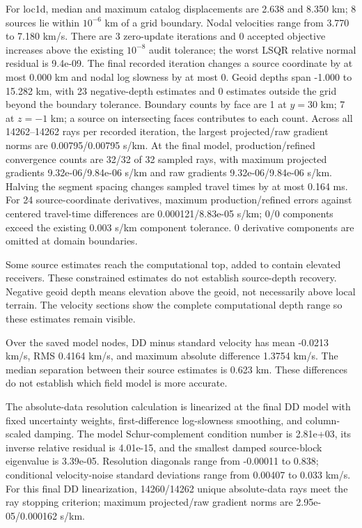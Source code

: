 For loc1d, median and maximum catalog displacements are 2.638 and 8.350 km; 8 sources lie within $10^{-6}$ km of a grid boundary. Nodal velocities range from 3.770 to 7.180 km/s. There are 3 zero-update iterations and 0 accepted objective increases above the existing $10^{-8}$ audit tolerance; the worst LSQR relative normal residual is 9.4e-09. The final recorded iteration changes a source coordinate by at most 0.000 km and nodal log slowness by at most 0. Geoid depths span -1.000 to 15.282 km, with 23 negative-depth estimates and 0 estimates outside the grid beyond the boundary tolerance. Boundary counts by face are 1 at $y=30$ km; 7 at $z=-1$ km; a source on intersecting faces contributes to each count. Across all 14262--14262 rays per recorded iteration, the largest projected/raw gradient norms are 0.00795/0.00795 s/km. At the final model, production/refined convergence counts are 32/32 of 32 sampled rays, with maximum projected gradients 9.32e-06/9.84e-06 s/km and raw gradients 9.32e-06/9.84e-06 s/km. Halving the segment spacing changes sampled travel times by at most 0.164 ms. For 24 source-coordinate derivatives, maximum production/refined errors against centered travel-time differences are 0.000121/8.83e-05 s/km; 0/0 components exceed the existing 0.003 s/km component tolerance. 0 derivative components are omitted at domain boundaries.

Some source estimates reach the computational top, added to contain elevated receivers. These constrained estimates do not establish source-depth recovery. Negative geoid depth means elevation above the geoid, not necessarily above local terrain. The velocity sections show the complete computational depth range so these estimates remain visible.

Over the saved model nodes, DD minus standard velocity has mean -0.0213 km/s, RMS 0.4164 km/s, and maximum absolute difference 1.3754 km/s. The median separation between their source estimates is 0.623 km. These differences do not establish which field model is more accurate.

The absolute-data resolution calculation is linearized at the final DD model with fixed uncertainty weights, first-difference log-slowness smoothing, and column-scaled damping. The model Schur-complement condition number is 2.81e+03, its inverse relative residual is 4.01e-15, and the smallest damped source-block eigenvalue is 3.39e-05. Resolution diagonals range from -0.00011 to 0.838; conditional velocity-noise standard deviations range from 0.00407 to 0.033 km/s. For this final DD linearization, 14260/14262 unique absolute-data rays meet the ray stopping criterion; maximum projected/raw gradient norms are 2.95e-05/0.000162 s/km.

